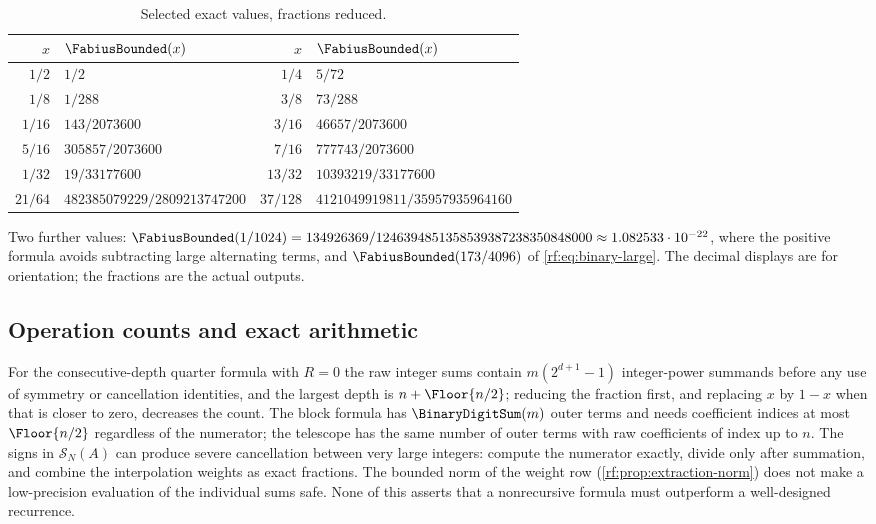 \documentclass[11pt,oneside]{article}
\theoremstyle{plain}
\theoremstyle{definition}
\theoremstyle{remark}
\newcommand{\Fb}{\FabiusBounded}            %
\newcommand{\Spow}[2]{\mathcal{S}_{#1}(#2)} %
\begin{document}
\begin{table}[htbp]
\centering
\caption{Selected exact values, fractions reduced.}
\label{rf:tab:examples-values}
\renewcommand{\arraystretch}{1.3}
\begin{tabular}{@{}rl@{\qquad}rl@{}}
\toprule
$x$ & $\Fb(x)$ & $x$ & $\Fb(x)$\\
\midrule
$1/2$ & $1/2$ & $1/4$ & $5/72$\\
$1/8$ & $1/288$ & $3/8$ & $73/288$\\
$1/16$ & $143/2073600$ & $3/16$ & $46657/2073600$\\
$5/16$ & $305857/2073600$ & $7/16$ & $777743/2073600$\\
$1/32$ & $19/33177600$ & $13/32$ & $10393219/33177600$\\
$21/64$ & $482385079229/2809213747200$ & $37/128$ & $4121049919811/35957935964160$\\
\bottomrule
\end{tabular}
\end{table}
Two further values: $\Fb(1/1024)=134926369/1246394851358539387238350848000
\approx1.082533\cdot10^{-22}$, where the positive formula avoids subtracting
large alternating terms, and $\Fb(173/4096)$ of \cref{rf:eq:binary-large}.
The decimal displays are for orientation; the fractions are the actual
outputs.

\subsection{Operation counts and exact arithmetic}
\label{rf:sec:examples-cost}

For the consecutive-depth quarter formula with $R=0$ the raw integer sums
contain $m(2^{d+1}-1)$ integer-power summands before any use of symmetry or
cancellation identities, and the largest depth is $n+\Floor{n/2}$; reducing
the fraction first, and replacing $x$ by $1-x$ when that is closer to zero,
decreases the count.  The block formula has $\BinaryDigitSum(m)$ outer
terms and needs coefficient indices at most $\Floor{n/2}$ regardless of the
numerator; the telescope has the same number of outer terms with raw
coefficients of index up to $n$.  The signs in $\Spow{N}{A}$ can produce
severe cancellation between very large integers: compute the numerator
exactly, divide only after summation, and combine the interpolation weights
as exact fractions.  The bounded norm of the weight row
(\cref{rf:prop:extraction-norm}) does not make a low-precision evaluation of
the individual sums safe.  None of this asserts that a nonrecursive formula
must outperform a well-designed recurrence.
\end{document}
